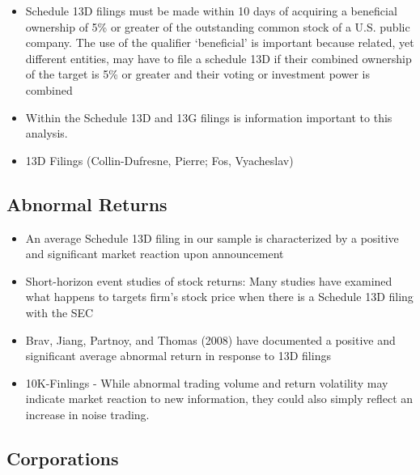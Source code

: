 \documentclass[12pt]{article}
\begin{document}
    \begin{itemize}
        \item Schedule 13D filings must be made within 10 days of acquiring a beneficial ownership of 5\% or greater of the outstanding common stock of a U.S. public company. The use of the qualifier ‘beneficial’ is important because related, yet different entities, may have to file a schedule 13D if their combined ownership of the target is 5\% or greater and their voting or investment power is combined \citep{Brigida2012}
        \item Within the Schedule 13D and 13G filings is information important to this analysis. \citep{Brigida2012}
        \item 13D Filings (Collin-Dufresne, Pierre; Fos, Vyacheslav)
        
    \end{itemize}

\subsection{Abnormal Returns}
    \begin{itemize}
        \item An average Schedule 13D filing in our sample is characterized by a positive and significant market reaction upon announcement \citep{Collin-Dufresne2015}

        \item Short-horizon event studies of stock returns: Many studies have examined what happens to targets firm’s stock price when there is a Schedule 13D filing with the SEC \citep{CoffeeJr.2014}

        \item Brav, Jiang, Partnoy, and Thomas (2008) have documented a positive and significant average abnormal return in response to 13D filings \citep{Brigida2012}

        \item 10K-Finlings - While abnormal trading volume and return volatility may indicate market reaction to new information, they could also simply reflect an increase in noise trading. \citep{You2009}

    \end{itemize}

\subsection{Corporations}
\end{document}

